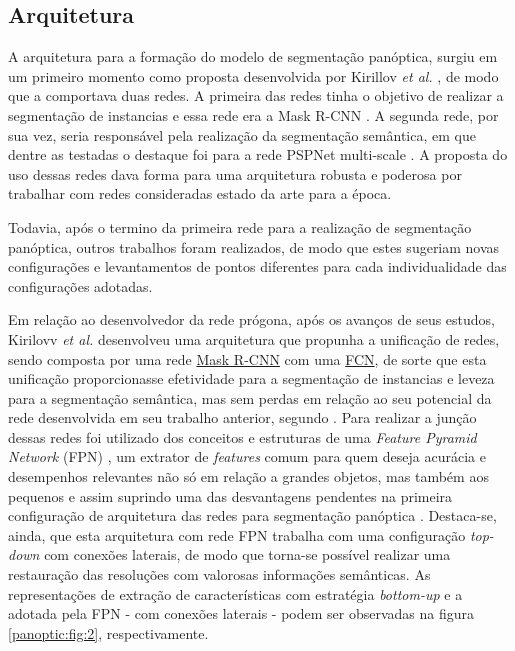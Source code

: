 \subsection{Arquitetura}
A arquitetura para a formação do modelo de segmentação panóptica, surgiu em um primeiro momento como proposta desenvolvida por Kirillov \textit{et al.} \cite{Kirillov2019a}, de modo que a comportava duas redes. A primeira das redes tinha o objetivo de realizar a segmentação de instancias e essa rede era a Mask R-CNN \cite{He2020}. A segunda rede, por sua vez, seria responsável pela realização da segmentação semântica, em que dentre as testadas o destaque foi para a rede PSPNet multi-scale \cite{Zhao2017}. A proposta do uso dessas redes dava forma para uma arquitetura robusta e poderosa \cite{Kirillov2019a} por trabalhar com redes consideradas estado da arte para a época.

Todavia, após o termino da primeira rede para a realização de segmentação panóptica, outros trabalhos foram realizados, de modo que estes sugeriam novas configurações e levantamentos de pontos diferentes para cada individualidade das configurações adotadas.

Em relação ao desenvolvedor da rede prógona, após os avanços de seus estudos, Kirilovv \textit{et al.} \cite{Kirillov2019} desenvolveu uma arquitetura que propunha a unificação de redes, sendo composta por uma rede \hyperref[instance:mask]{Mask R-CNN} com uma \hyperref[semantic:FCN]{FCN}, de sorte que esta unificação proporcionasse efetividade para a segmentação de instancias e leveza para a segmentação semântica, mas sem perdas em relação ao seu potencial da rede desenvolvida em seu trabalho anterior, segundo \cite{Kirillov2019}. Para realizar a junção dessas redes foi utilizado dos conceitos e estruturas de uma \textit{Feature Pyramid Network} (FPN) \cite{Lin2016}, um extrator de \textit{features} comum para quem deseja acurácia e desempenhos relevantes não só em relação a grandes objetos, mas também aos pequenos \cite{Lin2016} e assim suprindo uma das desvantagens pendentes na primeira configuração de arquitetura das redes para segmentação panóptica \cite{Kirillov2019, Kirillov2019a}. Destaca-se, ainda, que esta arquitetura com rede FPN trabalha com uma configuração \textit{top-down} com conexões laterais, de modo que torna-se possível realizar uma restauração das resoluções com valorosas informações semânticas. As representações de extração de características com estratégia \textit{bottom-up} e a adotada pela FPN - com conexões laterais - podem ser observadas na figura \ref{panoptic:fig:2}, respectivamente.

